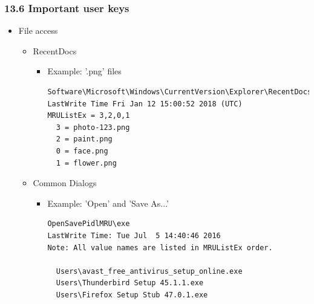 \begin{frame}[fragile]
  \frametitle{13.6 Important user keys}
   \begin{itemize}
      \item File access
      \begin{itemize}
          \item RecentDocs
          \begin{itemize}
              \item[] Example: '.png' files
                  \begin{lstlisting}[basicstyle=\tiny]
Software\Microsoft\Windows\CurrentVersion\Explorer\RecentDocs\.png
LastWrite Time Fri Jan 12 15:00:52 2018 (UTC)
MRUListEx = 3,2,0,1
  3 = photo-123.png
  2 = paint.png
  0 = face.png
  1 = flower.png
                  \end{lstlisting}
          \end{itemize}

          \item Common Dialogs
          \begin{itemize}
              \item[] Example: 'Open' and 'Save As...'
                  \begin{lstlisting}[basicstyle=\tiny]
OpenSavePidlMRU\exe
LastWrite Time: Tue Jul  5 14:40:46 2016
Note: All value names are listed in MRUListEx order.

  Users\avast_free_antivirus_setup_online.exe
  Users\Thunderbird Setup 45.1.1.exe
  Users\Firefox Setup Stub 47.0.1.exe
                  \end{lstlisting}
          \end{itemize}
      \end{itemize}
   \end{itemize}
\end{frame}








